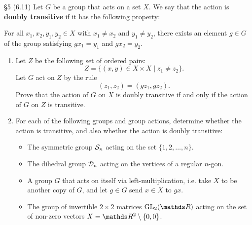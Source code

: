 \documentclass{homework}
\begin{document}
\begin{problem}{\S 5}
  (6.11) Let $G$ be a group that acts on a set $X$. We say that the action is \textbf{doubly
  transitive} if it has the following property: \begin{center}
    For all $x_1,x_2,y_1,y_2\in X$ with $x_1\neq x_2$ and $y_1\neq y_2$, there exists an element
    $g\in G$ of the group satisfying $gx_1=y_1$ and $gx_2=y_2$.
  \end{center}
  \begin{enumerate}[label=(\alph*)]
    \item Let $Z$ be the following set of ordered pairs: \[
          Z = \{(x,y)\in X\times X\mid z_1\neq z_2\} 
      .\] Let $G$ act on $Z$ by the rule \[
        (z_1,z_2)=(gz_1,gz_2)
      .\] Prove that the action of $G$ on $X$ is doubly transitive if and only if the action of $G$ on
      $Z$ is transitive.
    \item For each of the following groups and group actions, determine whether the action is
      transitive, and also whether the action is doubly transitive:
      \begin{itemize}
        \item The symmetric group $\mathcal{S}_n$ acting on the set $\{ 1,2,\ldots,n \}$.
        \item The dihedral group $\mathcal{D}_n$ acting on the vertices of a regular $n$-gon.
        \item A group $G$ that acts on itself via left-multiplication, i.e. take $X$ to be another
          copy of $G$, and let $g\in G$ send $x\in X$ to $gx$.
        \item The group of invertible $2\times 2$ matrices $\GL_{2}(\R)$ acting on the set of
          non-zero vectors $X=\R^2\setminus \{ 0,0 \}$.
      \end{itemize}
  \end{enumerate}
\end{problem}
\end{document}

